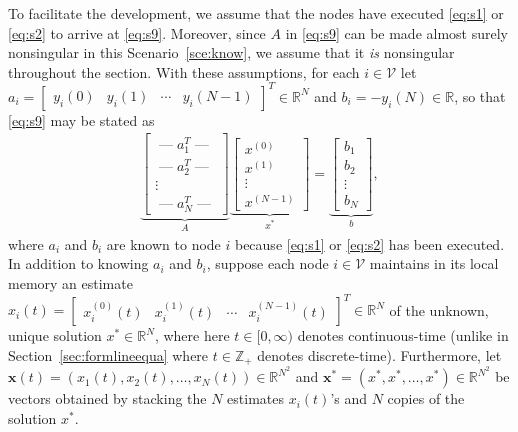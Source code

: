 \documentclass[11pt]{article}
\theoremstyle{plain}
\theoremstyle{definition}
\theoremstyle{remark}
\begin{document}
To facilitate the development, we assume that the nodes have executed \eqref{eq:s1} or \eqref{eq:s2} to arrive at \eqref{eq:s9}. Moreover, since $A$ in \eqref{eq:s9} can be made almost surely nonsingular in this Scenario~\ref{sce:know}, we assume that it {\em is} nonsingular throughout the section. With these assumptions, for each $i\in\mathcal{V}$ let $a_i=\begin{bmatrix}y_i(0) & y_i(1) & \cdots & y_i(N-1)\end{bmatrix}^T\in\mathbb{R}^N$ and $b_i=-y_i(N)\in\mathbb{R}$, so that \eqref{eq:s9} may be stated as
\begin{align}
\underbrace{\begin{bmatrix}\;\text{---}\;a_1^T\;\text{---}\;\\ \;\text{---}\;a_2^T\;\text{---}\;\\ \vdots\\ \;\text{---}\;a_N^T\;\text{---}\;\end{bmatrix}}_{A}\underbrace{\begin{bmatrix}x^{(0)}\\ x^{(1)}\\ \vdots\\ x^{(N-1)}\end{bmatrix}}_{x^*}=\underbrace{\begin{bmatrix}b_1\\ b_2\\ \vdots\\ b_N\end{bmatrix}}_{b},\label{eq:Ax*=b}
\end{align}
where $a_i$ and $b_i$ are known to node $i$ because \eqref{eq:s1} or \eqref{eq:s2} has been executed. In addition to knowing $a_i$ and $b_i$, suppose each node $i\in\mathcal{V}$ maintains in its local memory an estimate $x_i(t)=\begin{bmatrix}x_i^{(0)}(t) & x_i^{(1)}(t) & \cdots & x_i^{(N-1)}(t)\end{bmatrix}^T\in\mathbb{R}^N$ of the unknown, unique solution $x^*\in\mathbb{R}^N$, where here $t\in[0,\infty)$ denotes continuous-time (unlike in Section~\ref{sec:formlineequa} where $t\in\mathbb{Z}_+$ denotes discrete-time). Furthermore, let $\mathbf{x}(t)=(x_1(t),x_2(t),\ldots,x_N(t))\in\mathbb{R}^{N^2}$ and $\mathbf{x}^*=(x^*,x^*,\ldots,x^*)\in\mathbb{R}^{N^2}$ be vectors obtained by stacking the $N$ estimates $x_i(t)$'s and $N$ copies of the solution $x^*$.
\end{document}
